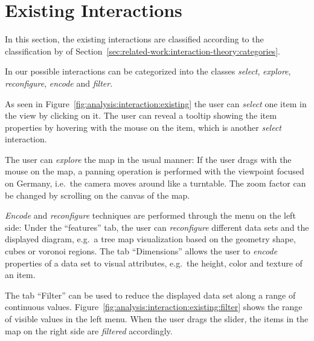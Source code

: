\section{Existing Interactions}
In this section, the existing interactions are classified according to the classification by \textcite{Yi2007} of Section~\ref{sec:related-work:interaction-theory:categories}.

In our \visan{} possible interactions can be categorized into the classes \emph{select}, \emph{explore}, \emph{reconfigure}, \emph{encode} and \emph{filter}.

As seen in Figure~\ref{fig:analysis:interaction:existing} the user can \emph{select} one item in the view by clicking on it.
The user can reveal a tooltip showing the item properties by hovering with the mouse on the item, which is another \emph{select} interaction.

The user can \emph{explore} the map in the usual manner:
If the user drags with the mouse on the map, a panning operation is performed with the viewpoint focused on Germany, i.e.\ the camera moves around like a turntable.
The zoom factor can be changed by scrolling on the canvas of the map.

\emph{Encode} and \emph{reconfigure} techniques are performed through the menu on the left side:
Under the ``features'' tab, the user can \emph{reconfigure} different data sets and the displayed diagram, e.g.\ a tree map visualization based on the geometry shape, cubes or voronoi regions.
The tab ``Dimensions'' allows the user to \emph{encode} properties of a data set to visual attributes, e.g.\ the height, color and texture of an item.

The tab ``Filter'' can be used to reduce the displayed data set along a range of continuous values.
Figure~\ref{fig:analysis:interaction:existing:filter} shows the range of visible values in the left menu.
When the user drags the slider, the items in the map on the right side are \emph{filtered} accordingly.

